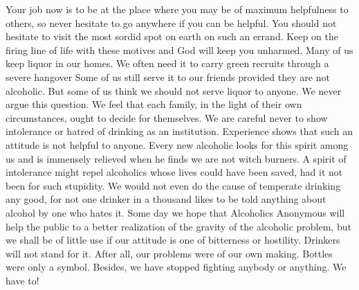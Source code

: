 \begin{biblechapter}
Your job now is to be at the place where you may be of maximum helpfulness to others, so never hesitate to go anywhere if you can be helpful.  You should not hesitate to visit the most sordid spot on earth on such an errand.  Keep on the firing line of life with these motives and God will keep you unharmed.
Many of us keep liquor in our homes.  We often need it to carry green recruits through a severe hangover  Some of us still serve it to our friends provided they are not alcoholic.  But some of us think we should not serve liquor to anyone.  We never argue this question.  We feel that each family, in the light of their own circumstances, ought to decide for themselves.
We are careful never to show intolerance or hatred of drinking as an institution.  Experience shows that such an attitude is not helpful to anyone.  Every new alcoholic looks for this spirit among us and is immensely relieved when he finds we are not witch burners.  A spirit of intolerance might repel alcoholics whose lives could have been saved, had it not been for such stupidity.  We would not even do the cause of temperate drinking any good, for not one drinker in a thousand likes to be told anything about alcohol by one who hates it.
Some day we hope that Alcoholics Anonymous will help the public to a better realization of the gravity of the alcoholic problem, but we shall be of little use if our attitude is one of bitterness or hostility.  Drinkers will not stand for it.
After all, our problems were of our own making.  Bottles were only a symbol.  Besides, we have stopped fighting anybody or anything.  We have to!
\end{biblechapter}

